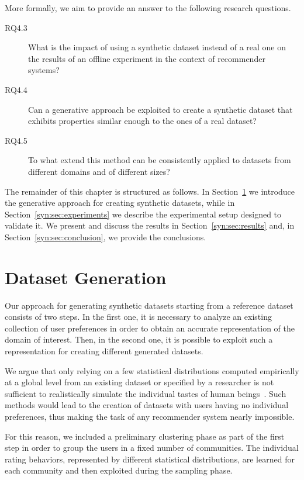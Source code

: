 More formally, we aim to provide an answer to the following research questions.

\begin{description}
\item[RQ4.3\label{syn:itm:rq1}] What is the impact of using a synthetic dataset instead of a real one on the results of an offline experiment in the context of recommender systems?
\item[RQ4.4\label{syn:itm:rq2}] Can a generative approach be exploited to create a synthetic dataset that exhibits properties similar enough to the ones of a real dataset?
\item[RQ4.5\label{syn:itm:rq3}] To what extend this method can be consistently applied to datasets from different domains and of different sizes?
\end{description}

The remainder of this chapter is structured as follows. In Section~\ref{syn:sec:generation} we introduce the generative approach for creating synthetic datasets, while in Section~\ref{syn:sec:experiments} we describe the experimental setup designed to validate it. We present and discuss the results in Section~\ref{syn:sec:results} and, in Section~\ref{syn:sec:conclusion}, we provide the conclusions.

\section{Dataset Generation}
\label{syn:sec:generation}

Our approach for generating synthetic datasets starting from a reference dataset consists of two steps. In the first one, it is necessary to analyze an existing collection of user preferences in order to obtain an accurate representation of the domain of interest. Then, in the second one, it is possible to exploit such a representation for creating different generated datasets.

We argue that only relying on a few statistical distributions computed empirically at a global level from an existing dataset or specified by a researcher is not sufficient to realistically simulate the individual tastes of human beings~\cite{Montaner2004}. Such methods would lead to the creation of datasets with users having no individual preferences, thus making the task of any recommender system nearly impossible.

For this reason, we included a preliminary clustering phase as part of the first step in order to group the users in a fixed number of communities. The individual rating behaviors, represented by different statistical distributions, are learned for each community and then exploited during the sampling phase.

